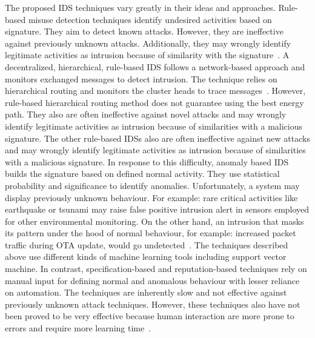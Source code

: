 \documentclass[conference,final]{IEEEtran}
\begin{document}
The proposed IDS techniques vary greatly in their ideas and approaches.
Rule-based misuse detection  techniques identify undesired activities based  on signature.
They aim to detect known attacks.
However, they are ineffective against previously unknown attacks.
Additionally, they may wrongly identify legitimate activities as intrusion because of similarity with the signature~\cite{372146, 1515559, ISI:000298891500099, Chen:2009:NMI:1516241.1516282, 1424814, Strikos_afull}.
A decentralized, hierarchical, rule-based IDS follows a network-based approach  and monitors exchanged  messages to detect intrusion. 
The technique relies on hierarchical routing  and monitors the cluster heads to trace messages~\cite{ioa07}.
However, rule-based hierarchical routing method does not guarantee using the best energy path.
They also are often ineffective against novel attacks and may wrongly identify legitimate activities as intrusion because of similarities with a malicious signature. 
The other rule-based IDSs also are often ineffective against new attacks and may wrongly identify legitimate activities as intrusion because of similarities with a malicious signature. 
In response to this difficulty, anomaly based IDS builds the signature based on defined normal activity.
They use statistical probability and significance to identify anomalies. Unfortunately, a system may display previously unknown behaviour.
For example: rare critical activities like earthquake or tsunami may raise false positive intrusion alert in sensors employed for other environmental monitoring.
On the other hand, an intrusion that masks its pattern under the hood of normal behaviour, for example: increased packet traffic during OTA update, would go undetected~\cite{ISI:000257882502160, 1593102, 1290173, 4024996}.
The techniques described above use different kinds of machine learning tools including support vector machine.
In contrast, specification-based and reputation-based techniques rely on manual input for defining normal and anomalous behaviour with lesser reliance on automation.
The techniques are inherently slow and not effective against previously unknown attack techniques.
However, these techniques also have not been proved to be very effective because human interaction are more prone to errors and require more learning time~\cite{Chen:2009:NMI:1516241.1516282, 4085803, Ko2001}. 
\end{document}
